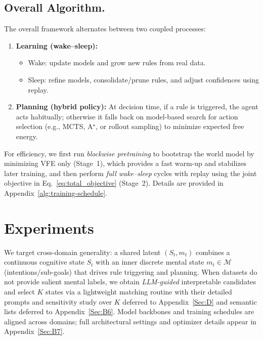 \documentclass{article} %
\newcommand{\Shuang}[1]{{\color{red}{\sf[Shuang: #1]}}}
\begin{document}
\subsection{Overall Algorithm.}
The overall framework alternates between two coupled processes:  
\begin{enumerate}
  \item \textbf{Learning (wake--sleep):}  
  \begin{itemize}
    \item Wake: update models and grow new rules from real data.  
    \item Sleep: refine models, consolidate/prune rules, and adjust confidences using replay.  
  \end{itemize}
  \item \textbf{Planning (hybrid policy):}  
  At decision time, if a rule is triggered, the agent acts habitually; otherwise it falls back on 
  model-based search for action selection (e.g., MCTS, A$^\star$, or rollout sampling) to minimize expected free energy.  
\end{enumerate}

For efficiency, we first run \emph{blockwise pretraining} to bootstrap the world model by minimizing VFE only (Stage~1), which provides a fast warm-up and stabilizes later training, 
and then perform \emph{full wake--sleep} cycles with replay using the joint objective in Eq.~\ref{eq:total_objective} (Stage~2). Details are provided in Appendix~\ref{alg:training-schedule}.


\section{Experiments}
\label{sec:experiments}


We target cross-domain generality: a shared latent $(S_t,m_t)$ combines a continuous cognitive state $S_t$ with an inner discrete mental state $m_t\in\mathcal{M}$ (intentions/sub-goals) that drives rule triggering and planning.
When datasets do not provide salient mental labels, we obtain \emph{LLM-guided} interpretable candidates and select $K$ states via a lightweight matching routine with their detailed prompts and  sensitivity study over $K$ deferred to Appendix~\ref{Sec:D} and  semantic lists deferred to Appendix~\ref{Sec:B6}.
Model backbones and training schedules are aligned across domains; full architectural settings and optimizer details appear in Appendix~\ref{Sec:B7}.
\end{document}
